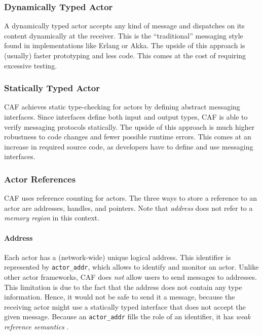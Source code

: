 \subsubsection{Dynamically Typed Actor}

A dynamically typed actor accepts any kind of message and dispatches on its
content dynamically at the receiver. This is the ``traditional'' messaging
style found in implementations like Erlang or Akka. The upside of this approach
is (usually) faster prototyping and less code. This comes at the cost of
requiring excessive testing.

\subsubsection{Statically Typed Actor}

CAF achieves static type-checking for actors by defining abstract messaging
interfaces. Since interfaces define both input and output types, CAF is able to
verify messaging protocols statically. The upside of this approach is much
higher robustness to code changes and fewer possible runtime errors. This comes
at an increase in required source code, as developers have to define and use
messaging interfaces.

\subsubsection{Actor References}
\label{actor-reference}

CAF uses reference counting for actors. The three ways to store a reference to
an actor are addresses, handles, and pointers. Note that \emph{address} does
not refer to a \emph{memory region} in this context.

\paragraph{Address}
\label{actor-address}

Each actor has a (network-wide) unique logical address. This identifier is
represented by \lstinline^actor_addr^, which allows to identify and monitor an
actor. Unlike other actor frameworks, CAF does \emph{not} allow users to send
messages to addresses. This limitation is due to the fact that the address does
not contain any type information. Hence, it would not be safe to send it a
message, because the receiving actor might use a statically typed interface
that does not accept the given message. Because an \lstinline^actor_addr^ fills
the role of an identifier, it has \emph{weak reference semantics}
.

